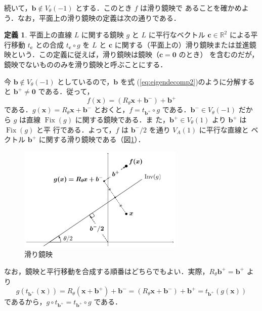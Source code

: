 \documentclass[11pt, uplatex, dvipdfmx, titlepage]{jsarticle}
\DeclareMathOperator{\Fix}{Fix}
\theoremstyle{definition}
\newtheorem*{definition}{定義}
\begin{document}
\newpage

続いて，$\bm{b} \notin V_{\theta}(-1)$ とする．このとき $f$ は滑り鏡映で
あることを確かめよう．なお，平面上の滑り鏡映の定義は次の通りである．

\begin{definition}
  平面上の直線 $L$ に関する鏡映 $g$ と $L$ に平行なベクトル $\bm{c}
  \in \mathbb{R}^2$ による平行移動 $t_{\bm{c}}$ との合成 $t_{\bm{c}}
  \circ g$ を $L$ と $\bm{c}$ に関する（平面上の）滑り鏡映または並進鏡
  映という．この定義に従えば，滑り鏡映は鏡映（$\bm{c}=\bm{0}$ のとき）
  を含むのだが，鏡映でないもののみを滑り鏡映と呼ぶことにする．
\end{definition}


今 $\bm{b} \notin V_{\theta}(-1)$ としているので，$\bm{b}$ を式 (\ref{eq:eigendecomp2})のように分解する
と $\bm{b}^{+} \neq \bm{0}$ である．従って，
\[
  f(\bm{x}) = \left(R_{\theta}\bm{x} + \bm{b}^{-}\right) + \bm{b}^{+}
\]
である．$g(\bm{x}) = R_{\theta}\bm{x}+\bm{b}^{-}$
とおくと，$f= t_{\bm{b}^{+}} \circ g$ である．$\bm{b}^{-} \in
V_{\theta}(-1)$ だから $g$ は直線 $\Fix(g)$ に関する鏡映である．ま
た，$\bm{b}^{+} \in V_{\theta}(1)$ より $\bm{b}^{+}$ は $\Fix(g)$ と平
行である．よって，$f$ は $\bm{b}^{-}/2$ を通り $V_A(1)$ に平行な直線と
ベクトル $\bm{b}^{+}$ に関する滑り鏡映である（図\ref{fig:glide2}）．
 \begin{figure}[h]
   \centering
   \includegraphics[height=5cm]{pictures/glide2.pdf}
   \caption{滑り鏡映}
   \label{fig:glide2}
 \end{figure}

 なお，鏡映と平行移動を合成する順番はどちらでもよい．実際，$R_{\theta}\bm{b}^{+}=\bm{b}^{+}$ より
\[
  g \left(t_{\bm{b}^{+}}(\bm{x})\right) = R_{\theta}\left(\bm{x} + \bm{b}^{+}\right) + \bm{b}^{-}
  = \left(R_{\theta}\bm{x} + \bm{b}^{-}\right) + \bm{b}^{+} = t_{\bm{b}^{+}}\left(g(\bm{x})\right)
\]
であるから，$g \circ t_{\bm{b}^{+}} = t_{\bm{b}^{+}} \circ g$ である．
\end{document}
